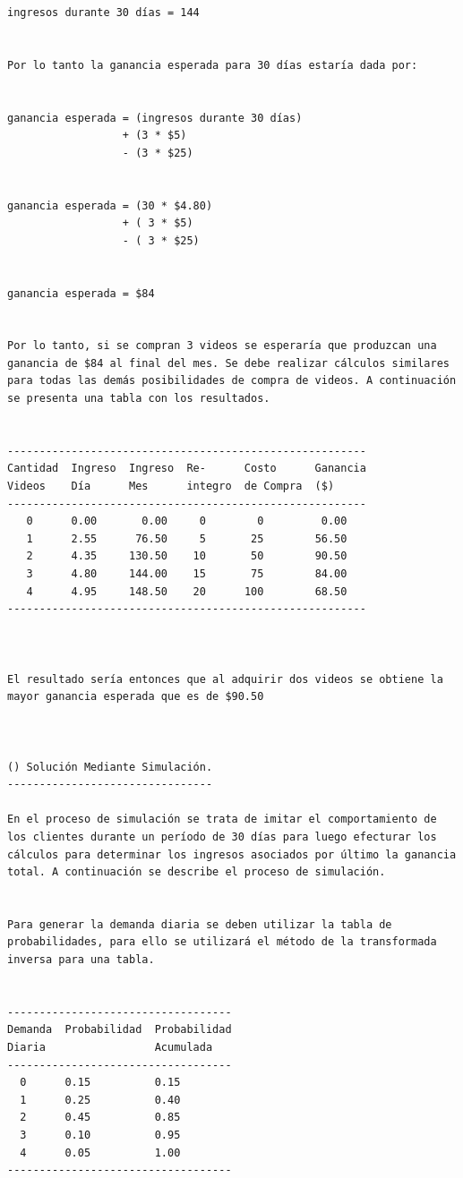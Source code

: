\begin{verbatim}
ingresos durante 30 días = 144


Por lo tanto la ganancia esperada para 30 días estaría dada por:


ganancia esperada = (ingresos durante 30 días)
                  + (3 * $5)
                  - (3 * $25)


ganancia esperada = (30 * $4.80)
                  + ( 3 * $5)
                  - ( 3 * $25)


ganancia esperada = $84


Por lo tanto, si se compran 3 videos se esperaría que produzcan una ganancia de $84 al final del mes. Se debe realizar cálculos similares para todas las demás posibilidades de compra de videos. A continuación se presenta una tabla con los resultados.


--------------------------------------------------------
Cantidad  Ingreso  Ingreso  Re-      Costo      Ganancia
Videos    Día      Mes      integro  de Compra  ($)
--------------------------------------------------------
   0      0.00       0.00     0        0         0.00
   1      2.55      76.50     5       25        56.50
   2      4.35     130.50    10       50        90.50
   3      4.80     144.00    15       75        84.00
   4      4.95     148.50    20      100        68.50
--------------------------------------------------------



El resultado sería entonces que al adquirir dos videos se obtiene la mayor ganancia esperada que es de $90.50



() Solución Mediante Simulación.
--------------------------------

En el proceso de simulación se trata de imitar el comportamiento de los clientes durante un período de 30 días para luego efecturar los cálculos para determinar los ingresos asociados por último la ganancia total. A continuación se describe el proceso de simulación.


Para generar la demanda diaria se deben utilizar la tabla de probabilidades, para ello se utilizará el método de la transformada inversa para una tabla.


-----------------------------------
Demanda  Probabilidad  Probabilidad
Diaria                 Acumulada
-----------------------------------
  0      0.15          0.15
  1      0.25          0.40
  2      0.45          0.85
  3      0.10          0.95
  4      0.05          1.00
-----------------------------------




\end{verbatim}
